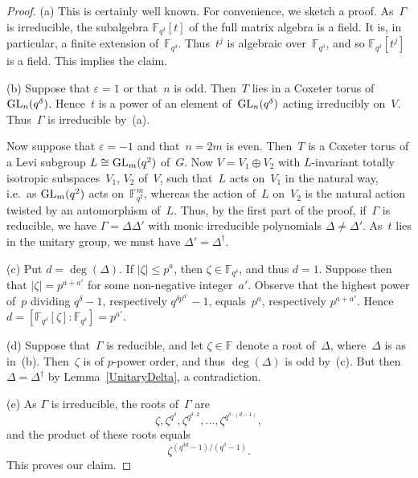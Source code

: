\documentclass[12pt]{amsart}
\def\GL{ \text{\rm GL} }
\theoremstyle{theorem}
\theoremstyle{definition}
\theoremstyle{remark}
\begin{document}
\begin{proof}
(a) This is certainly well known. For convenience, we sketch a proof.
As~$\Gamma$ is irreducible, the subalgebra $\mathbb{F}_{q^{\delta}}[t]$ of the 
full matrix algebra is a field. It is, in particular, a finite extension 
of~$\mathbb{F}_{q^{\delta}}$. Thus~$t^j$ is algebraic 
over~$\mathbb{F}_{q^{\delta}}$, and so $\mathbb{F}_{q^{\delta}}[t^j]$ is a 
field. This implies the claim.

(b) Suppose that $\varepsilon = 1$ or that~$n$ is odd. Then~$T$ lies in a 
Coxeter torus of~$\GL_n( q^{\delta} )$. Hence~$t$ is a power of an element 
of~$\GL_n( q^{\delta} )$ acting irreducibly on~$V$. 
Thus~$\Gamma$ is irreducible by~(a). 

Now suppose that $\varepsilon = -1$ and that~$n = 2m$ is even. Then~$T$ is a
Coxeter torus of a Levi subgroup $L \cong \GL_m( q^2 )$ of~$G$. Now 
$V = V_1 \oplus V_2$ with $L$-invariant totally isotropic 
subspaces~$V_1$, $V_2$ of~$V$, such that~$L$ acts on~$V_1$ in 
the natural way, i.e.\ as $\GL_m( q^2 )$ acts on~$\mathbb{F}^m_{q^2}$, whereas 
the action of~$L$ on~$V_2$ is the natural action twisted by an automorphism 
of~$L$. Thus, by the first part of the proof, if~$\Gamma$ is reducible, we have 
$\Gamma = \Delta \Delta'$ with monic irreducible polynomials 
$\Delta \neq \Delta'$. As~$t$ lies in the unitary group, we must have 
$\Delta' = \Delta^{\dagger}$.

(c) Put $d = \deg( \Delta )$. If $|\zeta| \leq p^a$, then 
$\zeta \in \mathbb{F}_{q^{\delta}}$, and thus $d = 1$. 
Suppose then that $|\zeta|= p^{a + a'}$ for some non-negative integer~$a'$. 
Observe that the highest power of~$p$ dividing $q^{\delta} - 1$, respectively 
$q^{\delta p^{a'}} - 1$, equals~$p^a$, respectively $p^{a+a'}$. 
Hence
$d = [\mathbb{F}_{q^{\delta}}[\zeta]\colon\!\mathbb{F}_{q^{\delta}}] = p^{a'}$. 

(d) Suppose that~$\Gamma$ is reducible, and let $\zeta \in \mathbb{F}$ denote
a root of~$\Delta$, where~$\Delta$ is as in~(b). Then~$\zeta$ is of $p$-power 
order, and thus $\deg(\Delta)$ is odd by~(c). But then 
$\Delta = \Delta^{\dagger}$ by Lemma~\ref{UnitaryDelta}, a contradiction.

(e) As $\Gamma$ is irreducible,
the roots of~$\Gamma$ are
$$\zeta, \zeta^{q^{\delta}}, \zeta^{q^{\delta \cdot 2}}, \ldots ,
\zeta^{q^{\delta \cdot(d - 1)}},$$
and the product of these roots equals
$$\zeta^{(q^{\delta d} - 1)/(q^{\delta} - 1)}.$$
This proves our claim.
\end{proof}
\end{document}

